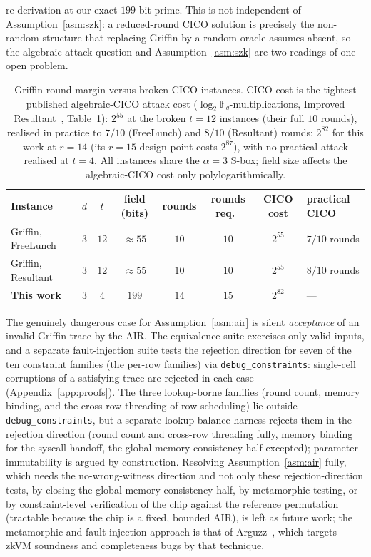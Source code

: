 re-derivation at our exact $199$-bit prime. This is not independent of Assumption~\ref{asm:szk}: a reduced-round CICO solution is precisely the non-random structure that replacing Griffin by a random oracle assumes absent, so the algebraic-attack question and Assumption~\ref{asm:szk} are two readings of one open problem.

\begin{table}[H]
    \centering
    \small
    \begin{tabular}{lccccccl}
        \toprule
        Instance & $d$ & $t$ & field (bits) & rounds & rounds req.\ & CICO cost & practical CICO \\
        \midrule
        Griffin, FreeLunch~\cite{freelunch2024}  & $3$ & $12$ & ${\approx}55$ & $10$ & $10$ & $2^{55}$ & $7/10$ rounds \\
        Griffin, Resultant~\cite{resultant2025}  & $3$ & $12$ & ${\approx}55$ & $10$ & $10$ & $2^{55}$ & $8/10$ rounds \\
        \textbf{This work}                       & $3$ & $4$  & $199$         & $14$ & $15$ & $2^{82}$  & --- \\
        \bottomrule
    \end{tabular}
    \caption{Griffin round margin versus broken CICO instances. CICO cost is the tightest published algebraic-CICO attack cost ($\log_2\mathbb{F}_q$-multiplications, Improved Resultant~\cite{resultant2025}, Table~1): $2^{55}$ at the broken $t{=}12$ instances (their full $10$ rounds), realised in practice to $7/10$ (FreeLunch) and $8/10$ (Resultant) rounds; $2^{82}$ for this work at $r{=}14$ (its $r{=}15$ design point costs $2^{87}$), with no practical attack realised at $t{=}4$. All instances share the $\alpha=3$ S-box; field size affects the algebraic-CICO cost only polylogarithmically.}
    \label{tab:round-margin}
\end{table}

The genuinely dangerous case for Assumption~\ref{asm:air} is silent \emph{acceptance} of an invalid Griffin trace by the AIR. The equivalence suite exercises only valid inputs, and a separate fault-injection suite tests the rejection direction for seven of the ten constraint families (the per-row families) via \texttt{debug\_constraints}: single-cell corruptions of a satisfying trace are rejected in each case (Appendix~\ref{app:proofs}). The three lookup-borne families (round count, memory binding, and the cross-row threading of row scheduling) lie outside \texttt{debug\_constraints}, but a separate lookup-balance harness rejects them in the rejection direction (round count and cross-row threading fully, memory binding for the syscall handoff, the global-memory-consistency half excepted); parameter immutability is argued by construction. Resolving Assumption~\ref{asm:air} fully, which needs the no-wrong-witness direction and not only these rejection-direction tests, by closing the global-memory-consistency half, by metamorphic testing, or by constraint-level verification of the chip against the reference permutation (tractable because the chip is a fixed, bounded AIR), is left as future work; the metamorphic and fault-injection approach is that of Arguzz~\cite{hochrainer2025arguzz}, which targets zkVM soundness and completeness bugs by that technique.

